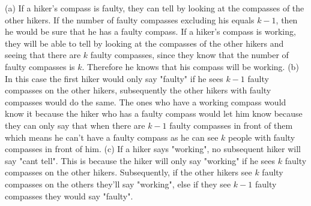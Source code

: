 \documentclass[a4paper]{exam}
\begin{document}
\begin{questions}
  \begin{solution}
\newline
(a)
\newline
If a hiker's compass is faulty, they can tell by looking at the compasses of the other hikers. If the number of faulty compasses excluding his equals $k-1$, then he would be sure that he has a faulty compass. If a hiker's compass is working, they will be able to tell by looking at the compasses of the other hikers and seeing that there are $k$ faulty compasses, since they know that the number of faulty compasses is $k$. Therefore he knows that his compass will be working.
\newline
(b)
\newline 
In this case the first hiker would only say "faulty" if he sees $k-1$ faulty compasses on the other hikers, subsequently the other hikers with faulty compasses would do the same. The ones who have a working compass would know it because the hiker who has a faulty compass would let him know because they can only say that when there are $k-1$ faulty compasses in front of them which means he can't have a faulty compass as he can see $k$ people with faulty compasses in front of him.
\newline
(c)
\newline
If a hiker says "working", no subsequent hiker will say "cant tell".
This is because the hiker will only say "working" if he sees $k$ faulty compasses on the other hikers. Subsequently, if the other hikers see $k$ faulty compasses on the others they'll say "working", else if they see $k-1$ faulty compasses they would say "faulty".
  \end{solution}
\end{questions}
\end{document}
